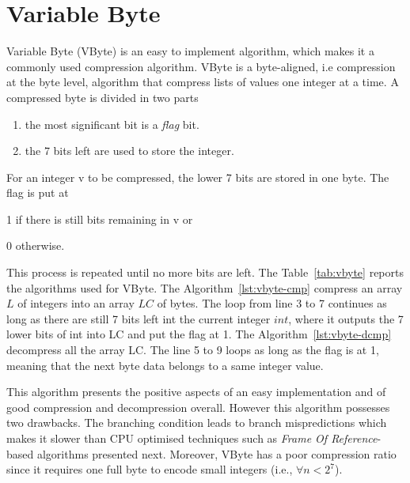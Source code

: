 \section{Variable Byte}

Variable Byte (VByte) is an easy to implement algorithm, which makes it a
commonly used compression algorithm. VByte is a byte-aligned, i.e compression
at the byte level, algorithm that compress lists of values one integer at a
time. A compressed byte is divided in two parts
\begin{enumerate}
  \item the most significant bit is a \emph{flag} bit.
  \item the 7 bits left are used to store the integer.
\end{enumerate}
For an integer v to be compressed, the lower 7 bits are stored in one byte. The
flag is put at
\begin{inparaenum}[(a)]
\item 1 if there is still bits remaining in v or 
\item 0 otherwise.
\end{inparaenum}
This process is repeated until no more bits are left. The Table~\ref{tab:vbyte}
reports the algorithms used for VByte. The Algorithm~\ref{lst:vbyte-cmp}
compress an array $L$ of integers into an array $LC$ of bytes. The loop from
line 3 to 7 continues as long as there are still 7 bits left int the current
integer $int$, where it outputs the 7 lower bits of int into LC and put the flag
at 1. The Algorithm~\ref{lst:vbyte-dcmp} decompress all the array LC. The
line 5 to 9 loops as long as the flag is at 1, meaning that the next byte data
belongs to a same integer value.

This algorithm presents the positive aspects of an easy implementation and of
good compression and decompression overall. However this algorithm possesses two
drawbacks.
The branching condition leads to branch mispredictions which makes it slower
than CPU optimised techniques such as \emph{Frame Of Reference}-based
algorithms presented next. Moreover, VByte has a poor compression ratio since
it requires one full byte to encode small integers (i.e., $\forall n < 2^7$).

